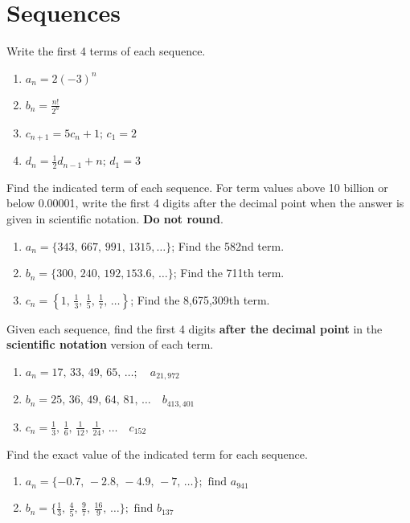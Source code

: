 \chapter{Sequences}

Write the first 4 terms of each sequence.
\begin{enumerate}
	\item $a_n = 2(-3)^n$
	\item $b_n = \frac{n!}{2^n}$
	\item $c_{n+1} = 5c_n + 1; \, c_1 = 2$
	\item $d_{n} = \frac{1}{2}d_{n-1} + n; \, d_1 = 3$
\end{enumerate}	\setcounter{Review}{\value{enumi}}

Find the indicated term of each sequence. For term values above 10 billion or below 0.00001, write the first 4 digits after the decimal point when the answer is given in scientific notation. \textbf{Do not round}.
\begin{enumerate}   \setcounter{enumi}{\value{Review}}
    \item $a_n = \{343, \, 667, \, 991, \, 1315, \dots\}$; Find the 582nd term.
    \item $b_n = \{300, \, 240, \, 192, 153.6, \, \dots\}$; Find the 711th term.
    \item $c_n = \left\{ 1, \, \frac{1}{3}, \, \frac{1}{5}, \, \frac{1}{7}, \, \dots\right\}$; Find the 8,675,309th term.
    \end{enumerate}
    \setcounter{Review}{\value{enumi}}
    
Given each sequence, find the first 4 digits \textbf{after the decimal point} in the \textbf{scientific notation} version of each term. 
\begin{enumerate}	\setcounter{enumi}{\value{Review}}
	\item $a_n = 17, \, 33, \, 49, \, 65, \, \dots; \quad a_{21,972}$
	\item $b_n = 25, \, 36, \, 49, \, 64, \, 81, \, \dots \quad b_{413,401}$
	\item $c_n = \frac{1}{3}, \, \frac{1}{6}, \, \frac{1}{12}, \, \frac{1}{24}, \, \dots \quad c_{152}$
\end{enumerate}	\setcounter{Review}{\value{enumi}}

Find the exact value of the indicated term for each sequence.
\begin{enumerate}   \setcounter{enumi}{\value{Review}}
    \item $a_n = \{-0.7, \, -2.8, \, -4.9, \, -7, \, \dots \}; \text{ find } a_{941}$
    \item $b_n = \{ \frac{1}{3}, \, \frac{4}{5}, \, \frac{9}{7}, \, \frac{16}{9}, \, \dots\}; \text{ find } b_{137}$
\end{enumerate} \setcounter{Review}{\value{enumi}}


